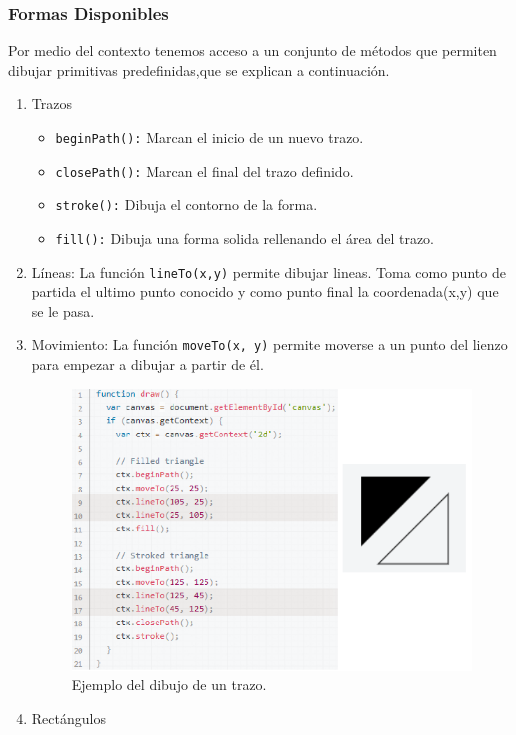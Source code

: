 \subsubsection*{Formas Disponibles}
Por medio del contexto tenemos acceso a un conjunto de métodos que permiten dibujar primitivas predefinidas,que se explican a continuación.
\begin{enumerate}
\item Trazos
  \begin{itemize}
      \item \texttt{beginPath():} Marcan el inicio de un nuevo trazo.
      \item \texttt{closePath():} Marcan el final del trazo definido.
      \item \texttt{stroke():} Dibuja el contorno de la forma.
      \item \texttt{fill():} Dibuja una forma solida rellenando el área del trazo.
  \end{itemize}
\item Líneas: La función \texttt{lineTo(x,y)} permite dibujar lineas. Toma como punto de partida el ultimo punto conocido y como  punto final la coordenada(x,y) que se le pasa.
\item Movimiento: La función \texttt{moveTo(x, y)} permite moverse a un punto del lienzo para empezar a dibujar a partir de él.
\begin{figure}[!h]
\begin{center}
   \includegraphics[width=0.8\linewidth]{Figures/lineas_Canvas}
  \decoRule
  \caption[Ejemplo del dibujo de un trazo]{Ejemplo del dibujo de un trazo.}
\label{fig:lineas_Canvas}
\end{center}
\end{figure}
\item Rectángulos
  \begin{itemize}

\end{itemize}
\end{enumerate}
